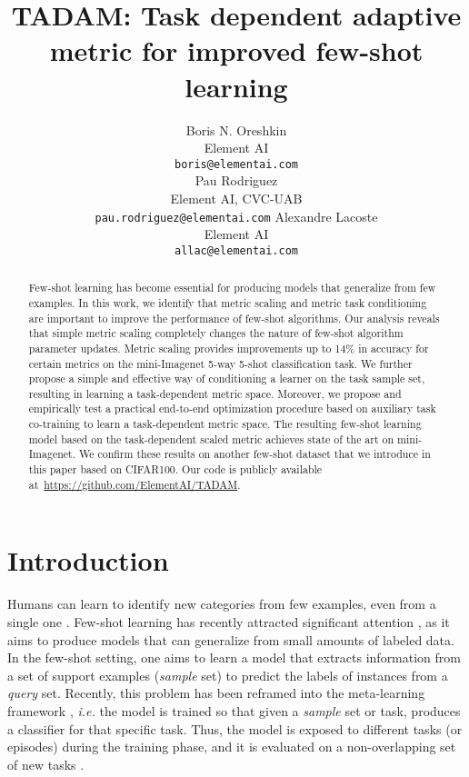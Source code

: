 \documentclass{article}
\title{TADAM: Task dependent adaptive metric for improved few-shot learning}
\author{
    Boris N. Oreshkin \\
    Element AI \\
    \texttt{boris@elementai.com} \\
    \And
    Pau Rodriguez \\
    Element AI, CVC-UAB \\
    \texttt{pau.rodriguez@elementai.com}
    \And
    Alexandre Lacoste \\
    Element AI \\
    \texttt{allac@elementai.com} \\
}
\begin{document}
\maketitle

\begin{abstract}
Few-shot learning has become essential for producing models that generalize from few examples. In this work, we identify that metric scaling and metric task conditioning are important to improve the performance of few-shot algorithms. Our analysis reveals that simple metric scaling completely changes the nature of few-shot algorithm parameter updates. Metric scaling provides improvements up to 14\% in accuracy for certain metrics on the mini-Imagenet 5-way 5-shot classification task. We further propose a simple and effective way of conditioning a learner on the task sample set, resulting in learning a task-dependent metric space. Moreover, we propose and empirically test a practical end-to-end optimization procedure based on auxiliary task co-training to learn a task-dependent metric space. The resulting few-shot learning model based on the task-dependent scaled metric achieves state of the art on mini-Imagenet. We confirm these results on another few-shot dataset that we introduce in this paper based on CIFAR100.  Our code is publicly available at~\url{https://github.com/ElementAI/TADAM}.
\end{abstract}

\section{Introduction}
Humans can learn to identify new categories from few examples, even from a single one \citep{carey1978acquiring}. Few-shot learning has recently attracted significant attention  \citep{vinyals2016matching, snell2017prototypical,sung2018learning,Santoro16metalearning,munkhdalai2018rapid,mishra2018simle}, as it aims to produce models that can generalize from small amounts of labeled data. In the few-shot setting, one aims to learn a model that extracts information from a set of support examples (\emph{sample} set) to predict the labels of instances from a \emph{query} set. Recently, this problem has been reframed into the meta-learning framework \cite{ravi2016optimization}, \emph{i.e.} the model is trained so that given a \emph{sample} set or task, produces a classifier for that specific task. Thus, the model is exposed to different tasks (or episodes) during the training phase, and it is evaluated on a non-overlapping set of new tasks \citep{vinyals2016matching}.
\end{document}
